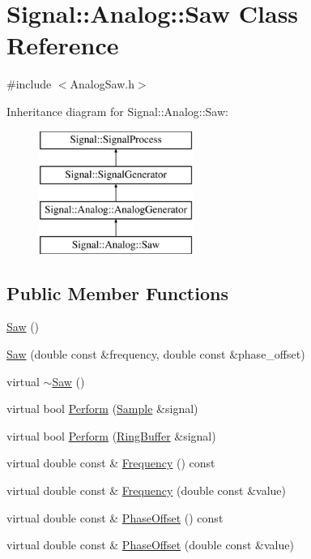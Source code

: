 \hypertarget{classSignal_1_1Analog_1_1Saw}{\section{Signal\+:\+:Analog\+:\+:Saw Class Reference}
\label{classSignal_1_1Analog_1_1Saw}
}


{\ttfamily \#include $<$Analog\+Saw.\+h$>$}

Inheritance diagram for Signal\+:\+:Analog\+:\+:Saw\+:\begin{figure}[H]
\begin{center}
\leavevmode
\includegraphics[height=4.000000cm]{classSignal_1_1Analog_1_1Saw}
\end{center}
\end{figure}
\subsection*{Public Member Functions}
\begin{DoxyCompactItemize}
\item 
\hyperlink{classSignal_1_1Analog_1_1Saw_aeb744d5c334761f6c144d4b589bdbf0f}{Saw} ()
\item 
\hyperlink{classSignal_1_1Analog_1_1Saw_aafaeff2f369ed888c077a83a24f37fa8}{Saw} (double const \&frequency, double const \&phase\+\_\+offset)
\item 
virtual \hyperlink{classSignal_1_1Analog_1_1Saw_a80faec2bb62156d658a6f9129211ebdc}{$\sim$\+Saw} ()
\item 
virtual bool \hyperlink{classSignal_1_1Analog_1_1Saw_ac91789b8322a0b39a15bc8dc6506d60b}{Perform} (\hyperlink{classSignal_1_1Sample}{Sample} \&signal)
\item 
virtual bool \hyperlink{classSignal_1_1Analog_1_1Saw_aafc49f02333a62a110cb3edb6b1df3a7}{Perform} (\hyperlink{classSignal_1_1RingBuffer}{Ring\+Buffer} \&signal)
\item 
virtual double const \& \hyperlink{classSignal_1_1SignalGenerator_a96af42ee68f94e9b04d034fd68b73ecd}{Frequency} () const 
\item 
virtual double const \& \hyperlink{classSignal_1_1SignalGenerator_af83b532bf3ddc3637c2fd7a1dfd095cb}{Frequency} (double const \&value)
\item 
virtual double const \& \hyperlink{classSignal_1_1SignalGenerator_ac2538ec946f001e394d2416fda698d1c}{Phase\+Offset} () const 
\item 
virtual double const \& \hyperlink{classSignal_1_1SignalGenerator_ac6a103ff72beaa338f6d18c812522d78}{Phase\+Offset} (double const \&value)
\end{DoxyCompactItemize}
